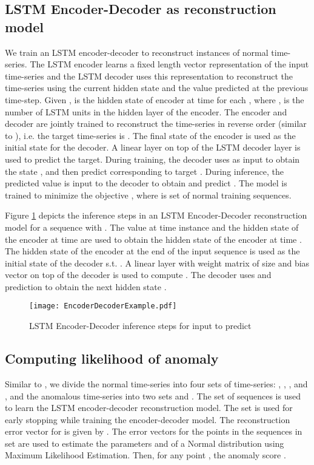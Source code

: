 \documentclass{article}
\begin{document}
\subsection{LSTM Encoder-Decoder as reconstruction model}
We train an LSTM encoder-decoder to reconstruct instances of normal time-series. The LSTM encoder learns a fixed length vector representation of the input time-series and the LSTM decoder uses this representation to reconstruct the time-series using the current hidden state and the value predicted at the previous time-step. Given ,  is the hidden state of encoder at time  for each , where ,  is the number of LSTM units in the hidden layer of the encoder. The encoder and decoder are jointly trained to reconstruct the time-series in reverse order (similar to \cite{p:seq2seqNIPS2014}), i.e. the target time-series is . The final state  of the encoder is used as the initial state for the decoder. A linear layer on top of the LSTM decoder layer is used to predict the target. During training, the decoder uses  as input to obtain the state , and then predict  corresponding to target . During inference, the predicted value  is input to the decoder to obtain  and predict .
The model is trained to minimize the objective , where  is set of normal training sequences.

Figure \ref{fig:EncDec} depicts the inference steps in an LSTM Encoder-Decoder reconstruction model for a sequence with . The value  at time instance  and the hidden state  of the encoder at time  are used to obtain the hidden state  of the encoder at time . The hidden state  of the encoder at the end of the input sequence is used as the initial state  of the decoder s.t. . A linear layer with weight matrix  of size  and bias vector  on top of the decoder is used to compute . The decoder uses  and prediction  to obtain the next hidden state .

\begin{figure}
 \centering
\texttt{[image: EncoderDecoderExample.pdf]}
\caption{\label{fig:EncDec}LSTM Encoder-Decoder inference steps for input  to predict }
\vspace{-13pt}
\end{figure}

\subsection{Computing likelihood of anomaly}\label{ssec:computeLike}
Similar to \cite{p:lstm-ad}, we divide the normal time-series into four sets of time-series: , , , and , and the anomalous time-series into two sets  and . The set of sequences  is used to learn the LSTM encoder-decoder reconstruction model. The set  is used for early stopping while training the encoder-decoder model.
The reconstruction error vector for  is given by . The error vectors for the points in the sequences in set  are used to estimate the parameters  and  of a Normal distribution  using Maximum Likelihood Estimation. Then, for any point , the anomaly score .
\end{document}
